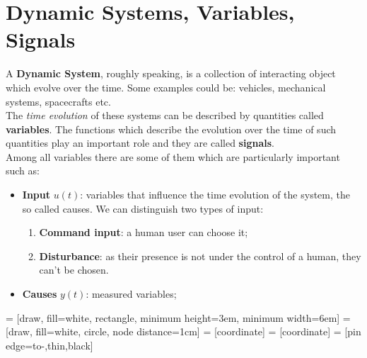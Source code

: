 \section{Dynamic Systems, Variables, Signals}
A \textbf{Dynamic System}, roughly speaking, is a collection of interacting object which evolve over the time. Some examples could be: vehicles, mechanical systems, spacecrafts etc.\\
The \textit{time evolution} of these systems can be described by quantities called \textbf{variables}. The functions which describe the evolution over the time of such quantities play an important role and they are called \textbf{signals}.\\
Among all variables there are some of them which are particularly important such as: 
\begin{itemize}
\setlength\itemsep{0em}
    \item \textbf{Input} $u(t)$: variables that influence the time evolution of the system, the so called causes. We can distinguish two types of input: 
    \begin{enumerate}
        \item \textbf{Command input}: a human user can choose it;
        \item \textbf{Disturbance}: as their presence is not under the control of a human, they can't be chosen.
    \end{enumerate}
    \item \textbf{Causes} $y(t)$: measured variables;
\end{itemize}

 = [draw, fill=white, rectangle, minimum height=3em, minimum width=6em]
 = [draw, fill=white, circle, node distance=1cm]
 = [coordinate]
 = [coordinate]
 = [pin edge={to-,thin,black}]

\begin{comment}
\begin{tikzpicture}[auto, node distance=2cm,>=latex']
    \node [input, name=input] {};
    \node [sum, right of=input] (sum) {};
    \node [block, right of=sum] (controller) {Controller};
    \node [block, right of=controller, pin={[pinstyle]above:D},
            node distance=3cm] (system) {System};

    \draw [->] (controller) -- node[name=u] {$u$} (system);
    \node [output, right of=system] (output) {};
    \node [block, below of=u] (measurements) {Measurements};

    \draw [draw,->] (input) -- node {$r$} (sum);
    \draw [->] (sum) -- node {$e$} (controller);
    \draw [->] (system) -- node [name=y] {$y$}(output);
    \draw [->] (y) |- (measurements);
    \draw [->] (measurements) -| node[pos=0.99] {$-$} 
        node [near end] {$y_m$} (sum);
\end{tikzpicture}
\end{comment}

